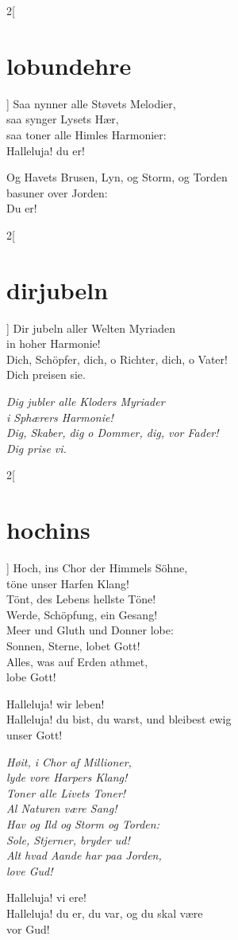 \documentclass[shorttitlesize=45,tocstyle=ref]{ees}
\begin{document}
{\begin{multicols}{2}[\section{lobundehre}]
Saa nynner alle Støvets Melodier,\\
saa synger Lysets Hær,\\
saa toner alle Himles Harmonier:\\
Halleluja! du er!

Og Havets Brusen, Lyn, og Storm, og Torden\\
basuner over Jorden:\\
Du er!
\end{multicols}

\begin{multicols}{2}[\section{dirjubeln}]
Dir jubeln aller Welten Myriaden\\
in hoher Harmonie!\\
Dich, Schöpfer, dich, o Richter, dich, o Vater!\\
Dich preisen sie.

\columnbreak\itshape
Dig jubler alle Kloders Myriader\\
i Sphærers Harmonie!\\
Dig, Skaber, dig o Dommer, dig, vor Fader!\\
Dig prise vi.
\end{multicols}

\begin{multicols}{2}[\section{hochins}]
Hoch, ins Chor der Himmels Söhne,\\
töne unser Harfen Klang!\\
Tönt, des Lebens hellste Töne!\\
Werde, Schöpfung, ein Gesang!\\
Meer und Gluth und Donner lobe:\\
Sonnen, Sterne, lobet Gott!\\
Alles, was auf Erden athmet,\\
lobe Gott!

Halleluja! wir leben!\\
Halleluja! du bist, du warst, und bleibest ewig\\
unser Gott!

\columnbreak\itshape
Høit, i Chor af Millioner,\\
lyde vore Harpers Klang!\\
Toner alle Livets Toner!\\
Al Naturen være Sang!\\
Hav og Ild og Storm og Torden:\\
Sole, Stjerner, bryder ud!\\
Alt hvad Aande har paa Jorden,\\
love Gud!

Halleluja! vi ere!\\
Halleluja! du er, du var, og du skal være\\
vor Gud!
\end{multicols}
}

\eesScore
\end{document}
